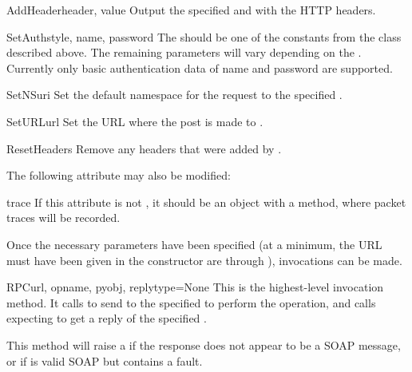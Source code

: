 \begin{methoddesc}{AddHeader}{header, value}
Output the specified  and  with the HTTP
headers.
\end{methoddesc}

\begin{methoddesc}{SetAuth}{style, name, password}
The  should be one of the constants from the 
class described above.
The remaining parameters will vary depending on the .
Currently only basic authentication data of name and password are
supported.
\end{methoddesc}

\begin{methoddesc}{SetNS}{uri}
Set the default namespace for the request to the specified .
\end{methoddesc}

\begin{methoddesc}{SetURL}{url}
Set the URL where the post is made to .
\end{methoddesc}

\begin{methoddesc}{ResetHeaders}{}
Remove any headers that were added by .
\end{methoddesc}

The following attribute may also be modified:

\begin{memberdesc}{trace}
If this attribute is not , it should be an object with a
 method, where packet traces will be recorded.
\end{memberdesc}

Once the necessary parameters have been specified (at a minimum, the URL
must have been given in the constructor are through ),
invocations can be made.

\begin{methoddesc}{RPC}{url, opname, pyobj, replytype=None}
This is the highest-level invocation method.
It calls  to send  to the specified 
to perform the  operation,
and calls  expecting to get a reply of the specified
.

This method will raise a  if the response does not
appear to be a SOAP message, or if is valid SOAP but contains a fault.
\end{methoddesc}

